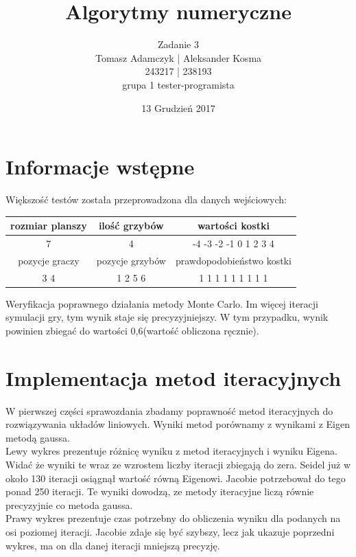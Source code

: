 \documentclass[8pt]{article}
\title{Algorytmy numeryczne}
\author{Zadanie 3 \\ Tomasz Adamczyk | Aleksander Kosma\\243217 | 238193\\grupa 1 tester-programista}
\date{13 Grudzień 2017}
\begin{document}
\maketitle 

\section*{Informacje wstępne}
Większość testów została przeprowadzona dla danych wejściowych:\\

\begin{center}
\begin{tabular}{  | c | c | c | }
  \hline
  rozmiar planszy & ilość grzybów & wartości kostki \\\hline
  7 &4& -4 -3 -2 -1 0 1 2 3 4\\\hline
   pozycje graczy & pozycje grzybów & prawdopodobieństwo kostki \\\hline
   3 4& 1 2 5 6& 1 1 1 1 1 1 1 1 1\\\hline
  \hline
\end{tabular} 
\end{center}

Weryfikacja poprawnego działania metody Monte Carlo. Im więcej iteracji symulacji gry, tym wynik staje się precyzyjniejszy. W tym przypadku, wynik powinien zbiegać do wartości 0,6(wartość obliczona ręcznie).
\begin{center}
\end{center}

\section*{Implementacja metod iteracyjnych}
W pierwszej części sprawozdania zbadamy poprawność metod iteracyjnych do rozwiązywania układów liniowych. Wyniki metod porównamy z wynikami z Eigen metodą gaussa.\\ Lewy wykres prezentuje różnicę wyniku z metod iteracyjnych i wyniku Eigena. Widać że wyniki te wraz ze wzrostem liczby iteracji zbiegają do zera. Seidel już w około 130 iteracji osiągnął wartość równą Eigenowi. Jacobie potrzebował do tego  ponad 250 iteracji. Te wyniki dowodzą, ze metody iteracyjne liczą równie precyzyjnie co metoda gaussa.\\
Prawy wykres prezentuje czas potrzebny do obliczenia wyniku dla podanych na osi poziomej iteracji. Jacobie zdaje się być szybszy, lecz jak ukazuje poprzedni wykres, ma on dla danej iteracji mniejszą precyzję.
\end{document}
